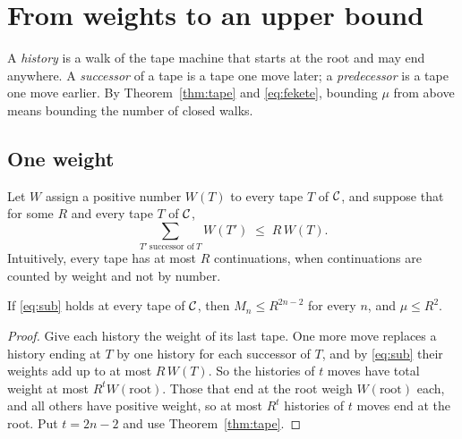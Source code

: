 \section{From weights to an upper bound}\label{sec:weights}

A \emph{history} is a walk of the tape machine that starts at the root and may end anywhere. A \emph{successor} of a
tape is a tape one move later; a \emph{predecessor} is a tape one move earlier. By Theorem~\ref{thm:tape} and
\eqref{eq:fekete}, bounding $\mu$ from above means bounding the number of closed walks.

\subsection{One weight}

Let $W$ assign a positive number $W(T)$ to every tape $T$ of $\mathcal{C}$, and suppose that for some $R$ and every tape $T$
of $\mathcal{C}$,
\begin{equation}\label{eq:sub}
  \sum_{T'\ \text{successor of}\ T} W(T') \;\le\; R\,W(T).
\end{equation}
Intuitively, every tape has at most $R$ continuations, when continuations are counted by weight and not by number.

\begin{lemma}\label{lem:oneweight}
If \eqref{eq:sub} holds at every tape of $\mathcal{C}$, then $M_n\le R^{2n-2}$ for every $n$, and $\mu\le R^2$.
\end{lemma}

\begin{proof}
Give each history the weight of its last tape. One more move replaces a history ending at $T$ by one history for each
successor of $T$, and by \eqref{eq:sub} their weights add up to at most $R\,W(T)$. So the histories of $t$ moves have
total weight at most $R^tW(\text{root})$. Those that end at the root weigh $W(\text{root})$ each, and all others have
positive weight, so at most $R^t$ histories of $t$ moves end at the root. Put $t=2n-2$ and use
Theorem~\ref{thm:tape}.
\end{proof}

